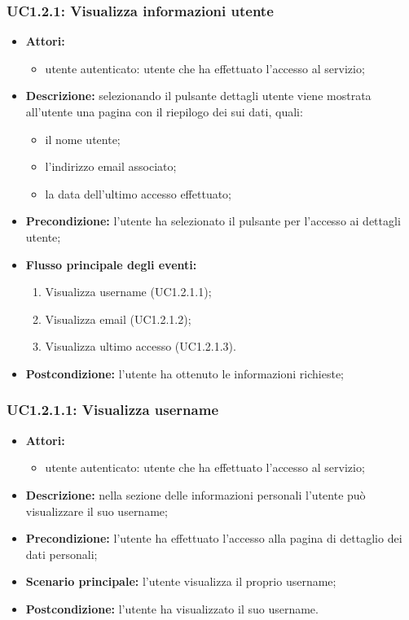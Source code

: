 \subsubsection{UC1.2.1: Visualizza informazioni utente}
\begin{itemize}
	\item \textbf{Attori:}
	\begin{itemize}
		\item utente autenticato: utente che ha effettuato l'accesso al servizio;
	\end{itemize}
	\item \textbf{Descrizione:} selezionando il pulsante dettagli utente viene mostrata all'utente una pagina con il riepilogo dei sui dati, quali:
	\begin{itemize}
		\item il nome utente;
		\item l'indirizzo email associato;
		\item la data dell'ultimo accesso effettuato;
	\end{itemize}
	\item \textbf{Precondizione:} l'utente ha selezionato il pulsante per l'accesso ai dettagli utente;
	\item \textbf{Flusso principale degli eventi:}
	\begin{enumerate}
    \item Visualizza username (UC1.2.1.1);
    \item Visualizza email (UC1.2.1.2);
    \item Visualizza ultimo accesso (UC1.2.1.3).
  \end{enumerate}
	\item \textbf{Postcondizione:} l'utente ha ottenuto le informazioni richieste;
\end{itemize}

\subsubsection{UC1.2.1.1: Visualizza username}
\begin{itemize}
	\item \textbf{Attori:}
	\begin{itemize}
		\item utente autenticato: utente che ha effettuato l'accesso al servizio;
	\end{itemize}
	\item \textbf{Descrizione:} nella sezione delle informazioni personali l'utente può visualizzare il suo username;
	\item \textbf{Precondizione:} l'utente ha effettuato l'accesso alla pagina di dettaglio dei dati personali;
	\item \textbf{Scenario principale:} l'utente visualizza il proprio username;
	\item \textbf{Postcondizione:} l'utente ha visualizzato il suo username.
\end{itemize}

